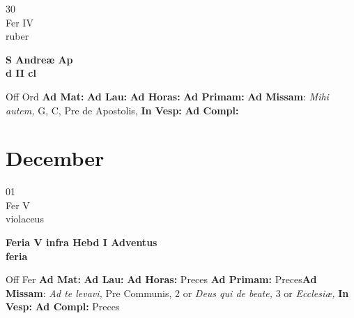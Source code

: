 \documentclass[10pt, openany]{book}
\begin{document}
        \begin{center}
            \begin{minipage}{3.5in}
                \vspace{2em}
                \begin{minipage}{0.5in}
                    {\Huge 30} \\
                    {\normalsize Fer IV} \\
                    {\normalsize ruber}
                \end{minipage}
                \begin{minipage}{3.0in}
                    \textbf{ \large S Andreæ Ap \\
                    \textnormal{\normalsize d II cl}} \\ 
                \end{minipage}
                \begin{justify}Off Ord
                    \textbf{Ad Mat: }
                    \textbf{Ad Lau: }
                    \textbf{Ad Horas: }
                    \textbf{Ad Primam: }\textbf{Ad Missam}: \textit{Mihi autem,} G, C, Pre de Apostolis,  
                    \textbf{In Vesp: }
                    \textbf{Ad Compl: }
                \end{justify}
            \end{minipage}
        \end{center}
    
        \chapter{December}
                        
        \begin{center}
            \begin{minipage}{3.5in}
                \vspace{2em}
                \begin{minipage}{0.5in}
                    {\Huge 01} \\
                    {\normalsize Fer V} \\
                    {\normalsize violaceus}
                \end{minipage}
                \begin{minipage}{3.0in}
                    \textbf{ \large Feria V infra Hebd I Adventus \\
                    \textnormal{\normalsize feria}} \\ 
                \end{minipage}
                \begin{justify}Off Fer
                    \textbf{Ad Mat: }
                    \textbf{Ad Lau: }
                    \textbf{Ad Horas: }Preces
                    \textbf{Ad Primam: }Preces\textbf{Ad Missam}: \textit{Ad te levavi,} Pre Communis, 2 or \textit{Deus qui de beate,} 3 or \textit{Ecclesiæ,}  
                    \textbf{In Vesp: }
                    \textbf{Ad Compl: }Preces
                \end{justify}
            \end{minipage}
        \end{center}
    
\end{document}
